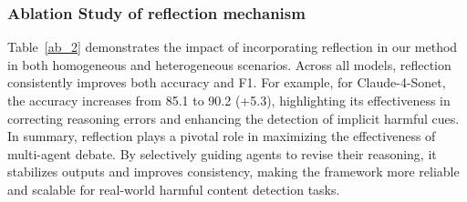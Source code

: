 \documentclass[letterpaper]{article} %
\begin{document}
\begin{table}[t]
\centering 
\caption{
Ablation study about the debate agent.
}
\label{ab_1}
 \vspace{-2mm}
\end{table}


\subsubsection{Ablation Study of reflection mechanism}


Table~\ref{ab_2} demonstrates the impact of incorporating reflection in our method in both homogeneous and heterogeneous scenarios.
Across all models, reflection consistently improves both accuracy and F1. For example, for Claude-4-Sonet, the accuracy increases from 85.1 to 90.2 (+5.3), highlighting its effectiveness in correcting reasoning errors and enhancing the detection of implicit harmful cues. 
In summary, reflection plays a pivotal role in maximizing the effectiveness of multi-agent debate. By selectively guiding agents to revise their reasoning, it stabilizes outputs and improves consistency, making the framework more reliable and scalable for real-world harmful content detection tasks.  
\end{document}
